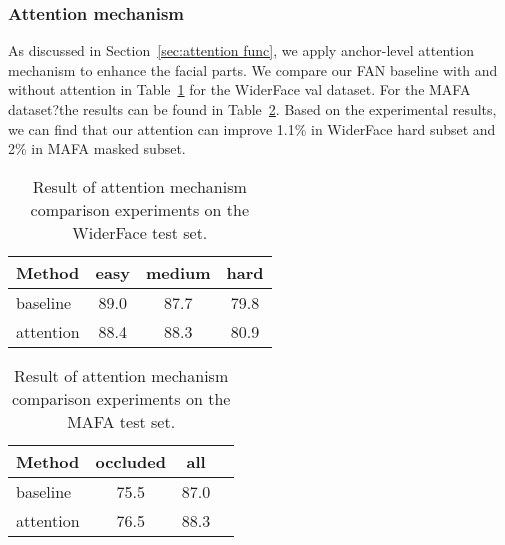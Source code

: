 \documentclass[10pt,twocolumn,letterpaper]{article}
\begin{document}
\subsubsection{Attention mechanism}
As discussed in Section~\ref{sec:attention func}, we apply anchor-level attention mechanism to enhance the facial parts. We compare our FAN baseline with and without attention in Table~\ref{table: attention_wider} for the WiderFace val dataset. For the MAFA dataset?the results can be found in Table~\ref{table: attention_mafa}. Based on the experimental results, we can find that our attention can improve 1.1\% in WiderFace hard subset and 2\% in MAFA masked subset.

\begin{table}[htbp]
\begin{center}
\begin{tabular}{|l|c|c|c|}
\hline
Method & easy & medium & hard \\
\hline
baseline & 89.0 & 87.7 & 79.8 \\
attention & 88.4 & 88.3 & 80.9 \\
\hline
\end{tabular}
\end{center}
\caption{Result of attention mechanism comparison experiments on the WiderFace test set.}
\label{table: attention_wider}
\end{table}

\begin{table}[htbp]
\begin{center}
\begin{tabular}{|l|c|c|c|}
\hline
Method & occluded & all \\
\hline
baseline & 75.5 & 87.0 \\
attention & 76.5 & 88.3 \\
\hline
\end{tabular}
\end{center}
\caption{Result of attention mechanism comparison experiments on the MAFA test set.}
\label{table: attention_mafa}
\end{table}
\end{document}
